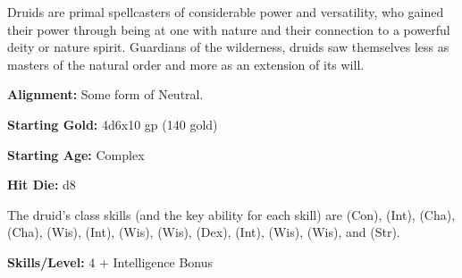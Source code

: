 
Druids are primal spellcasters of considerable power and versatility, who gained their power through being at one with nature and their connection to a powerful deity or nature spirit. Guardians of the wilderness, druids saw themselves less as masters of the natural order and more as an extension of its will.

\textbf{Alignment:} Some form of Neutral.

\textbf{Starting Gold:} 4d6x10 gp (140 gold)

\textbf{Starting Age:} Complex

\textbf{Hit Die:} d8

The druid's class skills (and the key ability for each skill) are  (Con),  (Int),  (Cha),  (Cha),  (Wis),  (Int),  (Wis),  (Wis),  (Dex),  (Int),  (Wis),  (Wis), and  (Str).

\textbf{Skills/Level:} 4 + Intelligence Bonus

\modebab{}
\goodfor{}
\poorref{}
\goodwil{}

